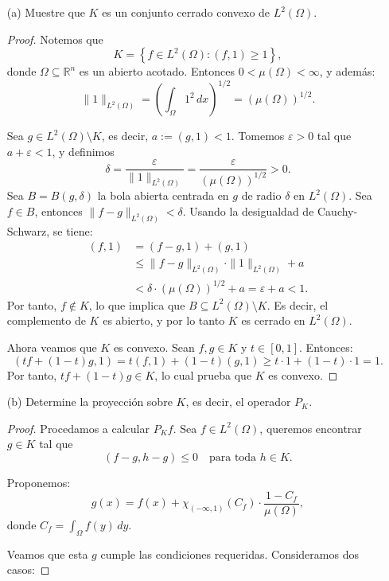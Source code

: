 \begin{itemize}
\item[(a)] Muestre que $K$ es un conjunto cerrado convexo de $L^2(\Omega)$.
  \begin{proof}
        Notemos que
\[
K = \left\{ f \in L^2(\Omega) : (f,1) \geq 1 \right\},
\]
donde \( \Omega \subseteq \mathbb{R}^n \) es un abierto acotado. Entonces \( 0 < \mu(\Omega) < \infty \), y además:
\[
\|1\|_{L^2(\Omega)} = \left( \int_{\Omega} 1^2 \, dx \right)^{1/2} = (\mu(\Omega))^{1/2}.
\]

Sea \( g \in L^2(\Omega) \setminus K \), es decir, \( a := (g,1) < 1 \). Tomemos \( \varepsilon > 0 \) tal que \( a + \varepsilon < 1 \), y definimos
\[
\delta = \frac{\varepsilon}{\|1\|_{L^2(\Omega)}} = \frac{\varepsilon}{(\mu(\Omega))^{1/2}}>0.
\]
Sea \( B = B(g, \delta) \) la bola abierta centrada en \( g \) de radio \( \delta \) en \( L^2(\Omega) \). Sea \( f \in B \), entonces \( \|f - g\|_{L^2(\Omega)} < \delta \). Usando la desigualdad de Cauchy-Schwarz, se tiene:
\begin{align*}
(f,1) &= (f - g, 1) + (g,1) \\
&\leq \|f - g\|_{L^2(\Omega)} \cdot \|1\|_{L^2(\Omega)} + a \\
&< \delta \cdot (\mu(\Omega))^{1/2} + a = \varepsilon + a < 1.
\end{align*}
Por tanto, \( f \notin K \), lo que implica que \( B \subseteq L^2(\Omega) \setminus K \). Es decir, el complemento de \( K \) es abierto, y por lo tanto \( K \) es cerrado en \( L^2(\Omega) \).

Ahora veamos que \( K \) es convexo. Sean \( f, g \in K \) y \( t \in [0,1] \). Entonces:
\[
(tf + (1 - t)g, 1) = t(f,1) + (1 - t)(g,1) \geq t \cdot 1 + (1 - t) \cdot 1 = 1.
\]
Por tanto, \( tf + (1 - t)g \in K \), lo cual prueba que \( K \) es convexo.

    \end{proof}
\item[(b)] Determine la proyección sobre $K$, es decir, el operador $P_K$.
    \begin{proof}
        Procedamos a calcular \( P_K f \). Sea \( f \in L^2(\Omega) \), queremos encontrar \( g \in K \) tal que  
\[
(f - g, h - g) \leq 0 \quad \text{para toda } h \in K.
\]

Proponemos:
\[
g(x) = f(x) + \chi_{(-\infty,1)}(C_f) \cdot \frac{1 - C_f}{\mu(\Omega)},
\]
donde \( C_f = \int_{\Omega} f(y) \, dy \).

Veamos que esta \( g \) cumple las condiciones requeridas. Consideramos dos casos:


\end{proof}
\end{itemize}
